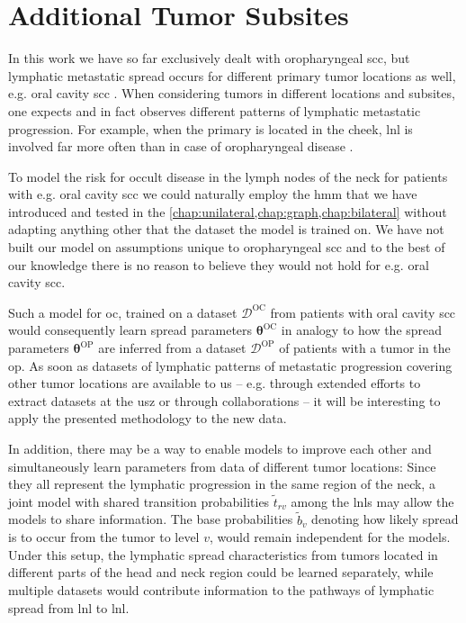 \documentclass[\relativeRoot/main.tex]{subfiles}
\begin{document}
\section{Additional Tumor Subsites}
\label{sec:future:subsites}

In this work we have so far exclusively dealt with oropharyngeal \gls{scc}, but lymphatic metastatic spread occurs for different primary tumor locations as well, e.g. oral cavity \acrlong{scc} \cite{shah_patterns_1990,razfar_incidence_2009,woolgar_topography_2007}. When considering tumors in different locations and subsites, one expects and in fact observes different patterns of lymphatic metastatic progression. For example, when the primary is located in the cheek, \gls{lnl} is involved far more often than in case of oropharyngeal disease \cite{woolgar_topography_2007}.

To model the risk for occult disease in the lymph nodes of the neck for patients with e.g. oral cavity \gls{scc} we could naturally employ the \gls{hmm} that we have introduced and tested in the \cref{chap:unilateral,chap:graph,chap:bilateral} without adapting anything other that the dataset the model is trained on. We have not built our model on assumptions unique to oropharyngeal \gls{scc} and to the best of our knowledge there is no reason to believe they would not hold for e.g. oral cavity \gls{scc}.

Such a model for \gls{oc}, trained on a dataset $\boldsymbol{\mathcal{D}}^\text{OC}$ from patients with oral cavity \gls{scc} would consequently learn spread parameters $\boldsymbol{\theta}^\text{OC}$ in analogy to how the spread parameters $\boldsymbol{\theta}^\text{OP}$ are inferred from a dataset $\boldsymbol{\mathcal{D}}^\text{OP}$ of patients with a tumor in the \gls{op}. As soon as datasets of lymphatic patterns of metastatic progression covering other tumor locations are available to us -- e.g. through extended efforts to extract datasets at the \gls{usz} or through collaborations -- it will be interesting to apply the presented methodology to the new data.

In addition, there may be a way to enable models to improve each other and simultaneously learn parameters from data of different tumor locations: Since they all represent the lymphatic progression in the same region of the neck, a joint model with shared transition probabilities $\tilde{t}_{rv}$ among the \glspl{lnl} may allow the models to share information. The base probabilities $\tilde{b}_v$ denoting how likely spread is to occur from the tumor to level $v$, would remain independent for the models. Under this setup, the lymphatic spread characteristics from tumors located in different parts of the head and neck region could be learned separately, while multiple datasets would contribute information to the pathways of lymphatic spread from \gls{lnl} to \gls{lnl}.
\end{document}
